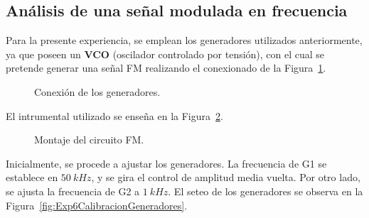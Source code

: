   \subsection{Análisis de una señal modulada en frecuencia}

    Para la presente experiencia, se emplean los generadores utilizados anteriormente, 
    ya que poseen un \textbf{VCO} (oscilador controlado por tensión), con el 
    cual se pretende generar una señal FM realizando el conexionado de la 
    Figura~\ref{fig:Exp6EsquemaGeneradores}. 

      \begin{figure}[H]
        \centering
          \caption{Conexión de los generadores.}
          \label{fig:Exp6EsquemaGeneradores}
      \end{figure}

    El intrumental utilizado se enseña en la Figura~\ref{fig:Exp6Montaje}.

      \begin{figure}[H]
        \centering
          \caption{Montaje del circuito FM.}
          \label{fig:Exp6Montaje}
      \end{figure}    
     
    
    Inicialmente, se procede a ajustar los generadores. La frecuencia de G1 se establece en 
    $50~kHz$, y se gira el control de amplitud media vuelta. Por otro lado, se ajusta la 
    frecuencia de G2 a $1~kHz$. El seteo de los generadores se observa en la 
    Figura~\ref{fig:Exp6CalibracionGeneradores}.

